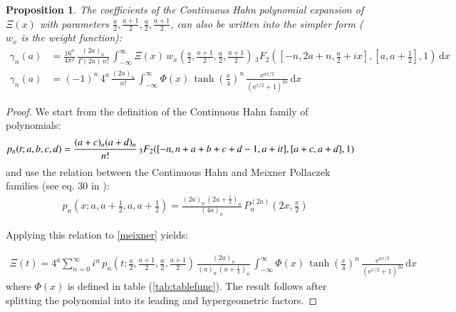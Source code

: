 \documentclass[a4paper,11pt,twoside]{amsart}
\newtheorem{proposition}[theorem]{Proposition}
\begin{document}
\begin{proposition}
The coefficients of the Continuous Hahn polynomial expansion of $\Xi(x)$ with parameters $\frac{a}{2}, \frac{a+1}{2},\frac{a}{2},\frac{a+1}{2}$, can also be written into the simpler form ($w_x$ is the weight function): 
\begin{align}
\gamma_n(a) &= \frac{16^a}{4\pi^2}\,\frac{(2a)_n}{\Gamma(2a)\,n!}\,\int_{-\infty}^{\infty} \Xi(x)\,w_x\left(\frac{a}{2},\frac{a+1}{2},\frac{a}{2},\frac{a+1}{2}\right)\,{}_3F_2\left(\left[-n,2a+n,\frac{a}{2}+ix\right],\left[a,a+\frac12\right],1\right)\,\mathrm{d}x \\
\gamma_n(a) &= (-1)^n\,4^a\,\frac{(2a)_n}{n!}\,\int_{-\infty}^{\infty} \Phi(x)\,\tanh\left(\frac{x}{4}\right)^{n}\,\frac{\mathrm{e}^{ax/2}}{\left(\mathrm{e}^{x/2}+1\right)^{2a}}\,\mathrm{d}x
\end{align}
\end{proposition}
\begin{proof}
We start from the definition of the Continuous Hahn family of polynomials:
\begin{align}
 p_n(t;a,b,c,d) &= \frac{(a+c)_n(a+d)_n}{n!}\, {}_3F_2([-n, n+ a+b+c+d-1,a+it], [a+c, a+d], 1) \notag
\end{align}
and use the relation between the Continuous Hahn and Meixner Pollaczek families (see eq. 30 in \cite{koesup}):
\begin{align}
 p_n\left(x;a,a+\frac12,a,a+\frac12\right) = \frac{(2a)_n\,\left(2a+\frac12\right)_n}{(4a)_n}\, P_n^{(2a)}\left(2x,\frac{\pi}{2}\right)
\end{align}

Applying this relation to \ref{meixner} yields:

\begin{align}
 \Xi(t)=4^a \sum_{n=0}^\infty i^n\,p_n\left(t;\frac{a}{2},\frac{a+1}{2},\frac{a}{2},\frac{a+1}{2}\right)\,\frac{(2a)_n}{(a)_n\,\left(a+\frac12\right)_n}\,\int_{-\infty}^\infty \Phi(x)\,\tanh\left(\frac{x}{4}\right)^n\,\frac{\textrm{e}^{ax/2}}{(\textrm{e}^{x/2}+1)^{2a}}\, \mathrm{d}x
\end{align}
where $\Phi(x)$ is defined in table (\ref{tab:tablefunc}). The result follows after splitting the polynomial into its leading and hypergeometric factors.
\end{proof}
\end{document}
